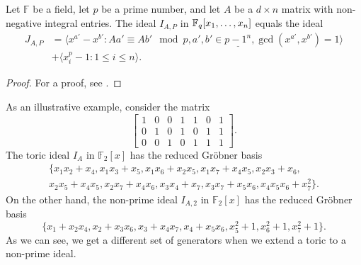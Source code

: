 \documentclass[english,bachelor]{liumaiex}
\begin{document}
\begin{prop}
Let $\mathbb{F}$ be a field, let $p$ be a prime number, and let $A$ be a $d\times n$ matrix with non-negative integral entries. The ideal $I_{A,P}$ in $\mathbb{F}_q[x_1,\dots,x_n]$ equals the ideal
\begin{align*}
J_{A,P}&= \langle x^{a'}-x^{b'}\colon Aa'\equiv Ab'\mod p, a',b'\in \underline{p-1^n}, \gcd(x^{a'},x^{b'})=1\rangle\\ &+ \langle x_i^p-1\colon 1\leq i\leq n\rangle.
\end{align*}
\end{prop}
\begin{proof}
For a proof, see \cite[pp. 53-54]{phd}.
\end{proof}
As an illustrative example, consider the matrix
\begin{displaymath}
\begin{bmatrix}
1 & 0 & 0 & 1 & 1 & 0 & 1\\
0 & 1 & 0 & 1 & 0 & 1 & 1\\
0 & 0 & 1 & 0 & 1 & 1 & 1
\end{bmatrix}.
\end{displaymath}
The toric ideal $I_A$ in $\mathbb{F}_2[x]$ has the reduced Gröbner basis
\begin{displaymath}
\begin{matrix}
\{x_1x_2+x_4,x_1x_3+x_5,x_1x_6+x_2x_5,x_1x_7+x_4x_5,x_2x_3+x_6,\\
x_2x_5+x_4x_5,x_2x_7+x_4x_6,x_3x_4+x_7,x_3x_7+x_5x_6,x_4x_5x_6+x_7^2\}.
\end{matrix}
\end{displaymath}
On the other hand, the non-prime ideal $I_{A,2}$ in $\mathbb{F}_2[x]$ has the reduced Gröbner basis
\begin{displaymath}
\{x_1+x_2x_4,x_2+x_3x_6,x_3+x_4x_7,x_4+x_5x_6,x_5^2+1,x_6^2+1,x_7^2+1\}.
\end{displaymath}
As we can see, we get a different set of generators when we extend a toric to a non-prime ideal.
\end{document}
